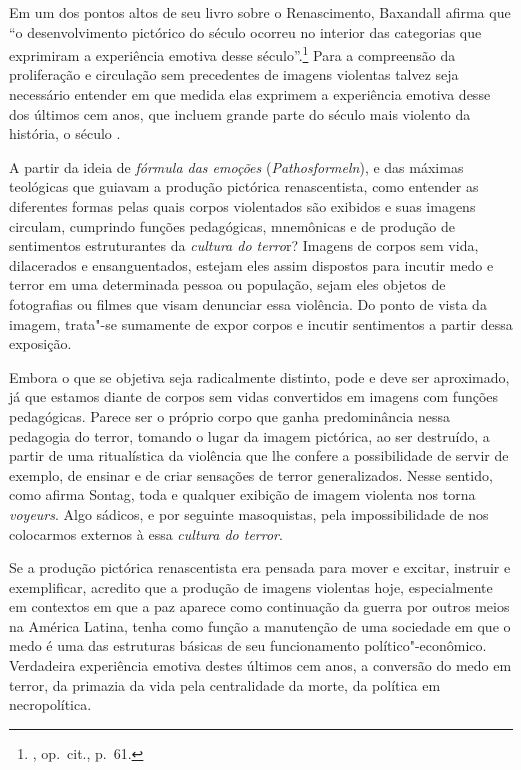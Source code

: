\asterisc

Em um dos pontos altos de seu livro sobre o Renascimento, Baxandall
afirma que ``o desenvolvimento pictórico do século  ocorreu no
interior das categorias que exprimiram a experiência emotiva desse
século''.\footnote{, op.~cit., p.~61.} Para a compreensão da
proliferação e circulação sem precedentes de imagens violentas talvez
seja necessário entender em que medida elas exprimem a experiência
emotiva desse dos últimos cem anos, que incluem grande parte do século
mais violento da história, o século .

A partir da ideia de \emph{fórmula das emoções} (\emph{Pathosformeln}),
e das máximas teológicas que guiavam a produção pictórica renascentista,
como entender as diferentes formas pelas quais corpos violentados são
exibidos e suas imagens circulam, cumprindo funções pedagógicas,
mnemônicas e de produção de sentimentos estruturantes da \emph{cultura
do terro}r? Imagens de corpos sem vida, dilacerados e ensanguentados,
estejam eles assim dispostos para incutir medo e terror em uma
determinada pessoa ou população, sejam eles objetos de fotografias ou
filmes que visam denunciar essa violência. Do ponto de vista da imagem,
trata"-se sumamente de expor corpos e incutir sentimentos a partir dessa
exposição.

Embora o que se objetiva seja radicalmente distinto, pode e deve ser
aproximado, já que estamos diante de corpos sem vidas convertidos em
imagens com funções pedagógicas. Parece ser o próprio corpo que ganha
predominância nessa pedagogia do terror, tomando o lugar da imagem
pictórica, ao ser destruído, a partir de uma ritualística da violência
que lhe confere a possibilidade de servir de exemplo, de ensinar e de
criar sensações de terror generalizados. Nesse sentido, como afirma
Sontag, toda e qualquer exibição de imagem violenta nos torna \emph{voyeurs}.
Algo sádicos, e por seguinte masoquistas, pela impossibilidade de nos
colocarmos externos à essa \emph{cultura do terror}.

Se a produção pictórica renascentista era pensada para mover e excitar,
instruir e exemplificar, acredito que a produção de imagens violentas
hoje, especialmente em contextos em que a paz aparece como continuação
da guerra por outros meios na América Latina, tenha como função a
manutenção de uma sociedade em que o medo é uma das estruturas básicas
de seu funcionamento político"-econômico. Verdadeira experiência emotiva
destes últimos cem anos, a conversão do medo em terror, da primazia da
vida pela centralidade da morte, da política em necropolítica.

